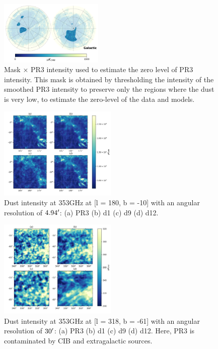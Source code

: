 \documentclass[twocolumn]{aastex631}
\begin{document}
\begin{figure}[ht!]
    \centering
    \includegraphics[width=0.44\textwidth]{figures/mask_intxPR3_zero_lvl.png}
    \caption{Mask $\times$ PR3 intensity used to estimate the zero level of PR3 intensity. This mask is obtained by thresholding the intensity of the smoothed PR3 intensity to preserve only the regions where the dust is very low, to estimate the zero-level of the data and models.}
    \label{fig:mask_zero_lvl_int}
\end{figure}

\begin{figure}[ht!]
    \centering
    \includegraphics[width=0.5\textwidth]{figures/gal_plane_non_smooth_wo_zero_lvl.png}
\caption{Dust intensity at 353GHz at [l = 180, b = -10] with an angular resolution of $4.94\mbox{$^\prime$}$: (a) PR3 (b) d1 (c) d9 (d) d12.}    
\label{fig:353_int_gal_plane}
\end{figure}
\begin{figure}[ht!]
    \centering
    \includegraphics[width=0.5\textwidth]{figures/BK_smooth_30'_wo_zero_lvl.png}
    \caption{Dust intensity at 353GHz at [l = 318, b = -61] with an angular resolution of $30\mbox{$^\prime$}$: (a) PR3 (b) d1 (c) d9 (d) d12. Here, PR3 is contaminated by CIB and extragalactic sources.}
    \label{fig:353_int_BK}
\end{figure}
\end{document}
